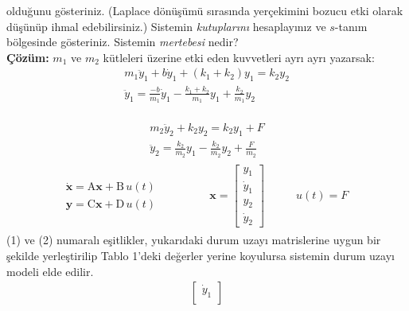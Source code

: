\documentclass[a4paper,11pt]{article}
\begin{document}
\begin{enumerate}[label=\textbf{\alph*}{.}]
olduğunu gösteriniz. (Laplace dönüşümü sırasında yerçekimini bozucu etki olarak düşünüp ihmal edebilirsiniz.) Sistemin \emph{kutuplarını} hesaplayınız ve $s$-tanım bölgesinde gösteriniz. Sistemin \emph{mertebesi} nedir?\\[1em]
\textbf{Çözüm:} $m_1$ ve $m_2$ kütleleri üzerine etki eden kuvvetleri ayrı ayrı yazarsak:\\[1em]
\begin{equation}
    \begin{gathered}
        m_1\ddot{y}_1 + b\dot{y}_1 + (k_1 + k_2)y_1 = k_2 y_2\\
        \ddot{y}_1 = \frac{-b}{m_1}\dot{y}_1 - \frac{k_1 + k_2}{m_1}y_1 + \frac{k_2}{m_1}y_2
    \end{gathered}
\end{equation}\\
\begin{equation}
    \begin{gathered}
        m_2\ddot{y}_2 + k_2 y_2 = k_2 y_1 + F\\
        \ddot{y}_2 = \frac{k_2}{m_2}y_1 - \frac{k_2}{m_2}y_2 + \frac{F}{m_2}
    \end{gathered}
\end{equation}\newpage
\begin{gather*}
    \begin{split}
        \dot{\mathbf{x}} = \mathrm{A}\mathbf{x} + \mathrm{B}\,u(t)\\
        \mathbf{y} = \mathrm{C}\mathbf{x} + \mathrm{D}\,u(t)
    \end{split}
    \quad\quad\quad\quad
    \begin{split}
        \mathbf{x} = \begin{bmatrix}
            y_1 \\
            \dot{y}_1\\
            y_2 \\
            \dot{y}_2
        \end{bmatrix}
    \end{split}
    \quad\quad
    \begin{split}
        u(t) = F
    \end{split}
\end{gather*}
(1) ve (2) numaralı eşitlikler, yukarıdaki durum uzayı matrislerine uygun bir şekilde yerleştirilip Tablo 1'deki değerler yerine koyulursa sistemin durum uzayı modeli elde edilir.
\begin{gather*}
    \begin{bmatrix}
        \dot{y}_1 \\

\end{bmatrix}
\end{gather*}
\end{enumerate}
\end{document}
